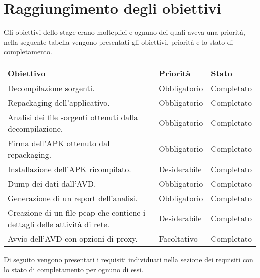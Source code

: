 

\section{Raggiungimento degli obiettivi}\label{sec:raggiungimento-degli-obiettivi}
Gli obiettivi dello stage erano molteplici e ognuno dei quali aveva una priorità, nella seguente tabella vengono presentati gli obiettivi, priorità e lo stato di completamento.

\begin{longtable}{|C{7cm}|C{3cm}|C{3cm}|}
    \hline
    \textbf{Obiettivo} &
    \textbf{Priorità} &
    \textbf{Stato} \\\hline
    Decompilazione sorgenti.
    & Obbligatorio & Completato \\\hline
    Repackaging dell'applicativo.
    & Obbligatorio & Completato \\\hline
    Analisi dei file sorgenti ottenuti dalla decompilazione.
    & Obbligatorio & Completato \\\hline
    Firma dell'APK ottenuto dal repackaging.
    & Obbligatorio & Completato \\\hline
    Installazione dell'APK ricompilato.
    & Desiderabile & Completato \\\hline
    Dump dei dati dall'AVD.
    & Obbligatorio & Completato \\\hline
    Generazione di un report dell'analisi.
    & Obbligatorio & Completato \\\hline
    Creazione di un file \gls{pcap} che contiene i dettagli delle attività di rete.
    & Desiderabile & Completato \\\hline
    Avvio dell'AVD con opzioni di proxy.
    & Facoltativo  & Completato \\\hline
\end{longtable}
Di seguito vengono presentati i requisiti individuati nella  \hyperref[subsec:classificazione]{sezione dei requisiti} con lo stato di completamento per ognuno di essi.
